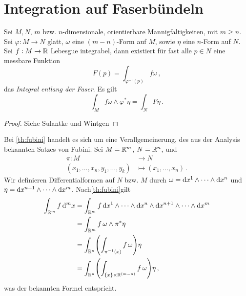 \section[Integration inv Fkt]{Integration auf Faserbündeln}
\begin{theorem}\label{th:fubini}
Sei $M,N$, $m$ bzw. $n$-dimensionale, orientierbare Mannigfaltigkeiten, mit
$m\geq n$.
Sei $\varphi:M\to N$ glatt, $\omega$ eine $(m-n)$-Form auf $M$, sowie $\eta$
eine $n$-Form auf $N$. Sei $f:M\to \mathbb{R}$ Lebesgue integrabel, dann existiert 
für fast alle $p\in N$ eine messbare Funktion
\begin{equation}
F(p)=\int_{\varphi^{-1}(p)}f\omega\,,
\end{equation}
das \emph{Integral entlang der Faser}. Es gilt
\begin{equation}
\int_{M}f\omega\wedge\varphi^*\eta=\int_{N}F \eta\,.
\end{equation}
\end{theorem}
\begin{proof}
Siehe Sulantke und Wintgen
\end{proof}
\begin{bemerkung}
Bei \autoref{th:fubini} handelt es sich um eine Verallgemeinerung, des aus der
Analysis bekannten Satzes von Fubini.
Sei $M=\mathbb{R}^m$, $N=\mathbb{R}^n$, und
\begin{align*}
\pi :M &\to N\\
(x_1,\dots,x_n,y_1,\dots,y_k) &\mapsto (x_1,\dots,x_n)\,.
\end{align*}
Wir definieren Differentialformen auf $N$ bzw. $M$ durch
$\omega=\dif{x}^1\wedge\cdots\wedge\dif{x}^n$ und
$\eta=\dif{x}^{n+1}\wedge\cdots\wedge\dif{x}^m$.
Nach\autoref{th:fubini}gilt
\begin{equation}
\begin{split}
\int_{\Reals^m} f\dif{}^m x &= \int_{\Reals^m}
f\dif{x}^1\wedge\cdots\wedge\dif{x}^n\wedge\dif{x}^{n+1}\wedge\cdots\wedge\dif{x}^m\\
&= \int_{\Reals^m}f\,\omega\wedge\pi^*\eta\\
&= \int_{\Reals^n}\left(\int_{\pi^{-1}(x)}f\,\omega\right)\eta\\
&= \int_{\Reals^n}\left(\int_{\{x\}\times\Reals^{(m-n)}}f\,\omega\right)\eta\,,
\end{split}
\end{equation}
was der bekannten Formel entspricht.
\end{bemerkung}
